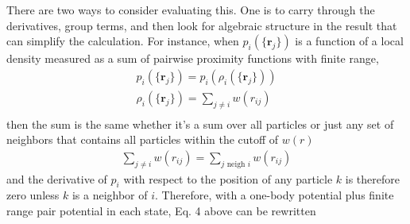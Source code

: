 \documentclass[11pt, oneside]{article}   	%
\begin{document}
There are two ways to consider evaluating this. One is to carry through the derivatives, group terms, and then look for algebraic structure in the result that can simplify the calculation. For instance, when $p_i(\{\mathbf{r}_j\})$ is a function of a local density measured as a sum of pairwise proximity functions with finite range,
\begin{align}
p_i(\{\mathbf{r}_j\}) = p_i( \rho_i(\{\mathbf{r}_j\}) ) \\
\rho_i(\{\mathbf{r}_j\}) = \sum_{j \neq i} w( r_{ij} ) \\
\end{align}
then the sum is the same whether it's a sum over all particles or just any set of neighbors that contains all particles within the cutoff of $w(r)$
\begin{align}
\sum_{j \neq i} w( r_{ij} ) = \sum_{j \text{ neigh } i} w( r_{ij} )
\end{align}
and the derivative of $p_i$ with respect to the position of any particle $k$ is therefore zero unless $k$ is a neighbor of $i$. Therefore, with a one-body potential plus finite range pair potential in each state, Eq. 4 above can be rewritten
\end{document}
